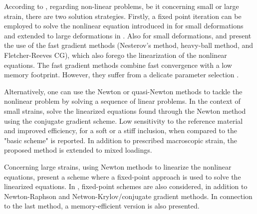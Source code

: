 According to \cite{kabel_efficient_2014}, regarding non-linear problems, be it concerning small or large strain, there are two solution strategies.
Firstly, a fixed point iteration can be employed to solve the nonlinear equation introduced in \cite{moulinec_numerical_1998} for small deformations and extended to large deformations in \cite{eisenlohr_spectral_2013}.
Also for small deformations, \cite{schneider_fft-based_2017} and \cite{schneider_dynamical_2020} present the use of the fast gradient methods (Nesterov's method, heavy-ball method, and Fletcher-Reeves CG), which also forego the linearization of the nonlinear equations.
The fast gradient methods combine fast convergence with a low memory footprint.
However, they suffer from a delicate parameter selection \citep{schneider_dynamical_2020}.

Alternatively, one can use the Newton or quasi-Newton methods to tackle the nonlinear problem by solving a sequence of linear problems.
In the context of small strains, \cite{gelebart_non-linear_2013} solve the linearized equations found through the Newton method using the conjugate gradient scheme.
Low sensitivity to the reference material and improved efficiency, for a soft or a stiff inclusion, when compared to the "basic scheme" is reported.
In addition to prescribed macroscopic strain, the proposed method is extended to mixed loadings.

Concerning large strains, using Newton methods to linearize the nonlinear equations, \cite{lahellec_analysis_2003} present a scheme where a fixed-point approach is used to solve the linearized equations.
In \cite{kabel_efficient_2014}, fixed-point schemes are also considered, in addition to Newton-Raphson and Netwon-Krylov/conjugate gradient methods.
In connection to the last method, a memory-efficient version is also presented.

